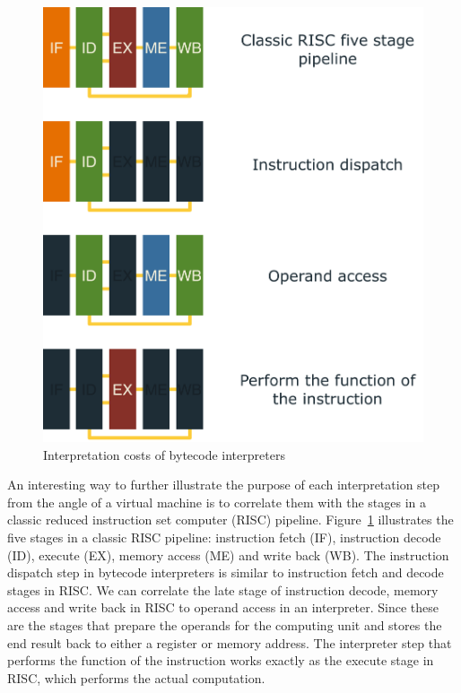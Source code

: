 \begin{figure}[th]
\centering
\includegraphics[scale=.25]{figures/ch2-risc-pipeline.pdf}
\caption{Interpretation costs of bytecode interpreters}
\label{fig:interpretation-cost}
\end{figure}

An interesting way to further illustrate the purpose of each interpretation step
from the angle of a virtual machine is to correlate them with the stages in a classic reduced instruction set computer (RISC) pipeline.
Figure~\ref{fig:interpretation-cost} illustrates the five stages in a classic RISC pipeline:
instruction fetch (IF), instruction decode (ID), execute (EX), memory access (ME) and write back (WB).
The instruction dispatch step in bytecode interpreters is similar to instruction fetch and decode stages in RISC.
We can correlate the late stage of instruction decode, memory access and write back in RISC to operand access in an interpreter.
Since these are the stages that prepare the operands for the computing unit and stores the end result back to either a register or memory address.
The interpreter step that performs the function of the instruction works exactly as the execute stage in RISC, which performs the actual computation.

